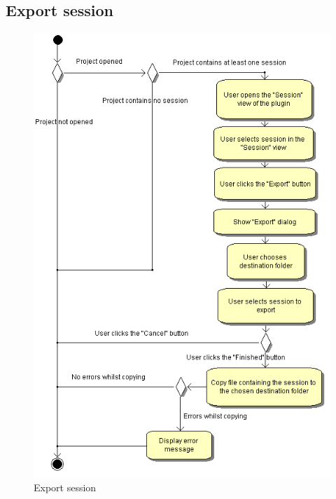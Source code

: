 \subsection{Export session}
\begin{figure}[htb]
 \centering
 \includegraphics[height=0.7\textheight]{images/Activities/export_session.png}
 \caption{Export session}
 \label{ac_fg:export}
\end{figure}

\clearpage
